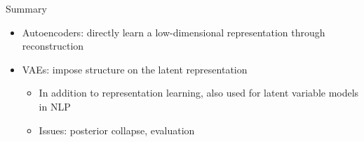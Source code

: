 \documentclass[usenames,dvipsnames,notes]{beamer}
\begin{document}
\begin{frame}
    {Summary}
    \begin{itemize}
        \item Autoencoders: directly learn a low-dimensional representation through reconstruction
        \item VAEs: impose structure on the latent representation
            \begin{itemize}
                \item In addition to representation learning, also used for latent variable models in NLP
                \item Issues: posterior collapse, evaluation 
            \end{itemize}
    \end{itemize}
\end{frame}
\end{document}

